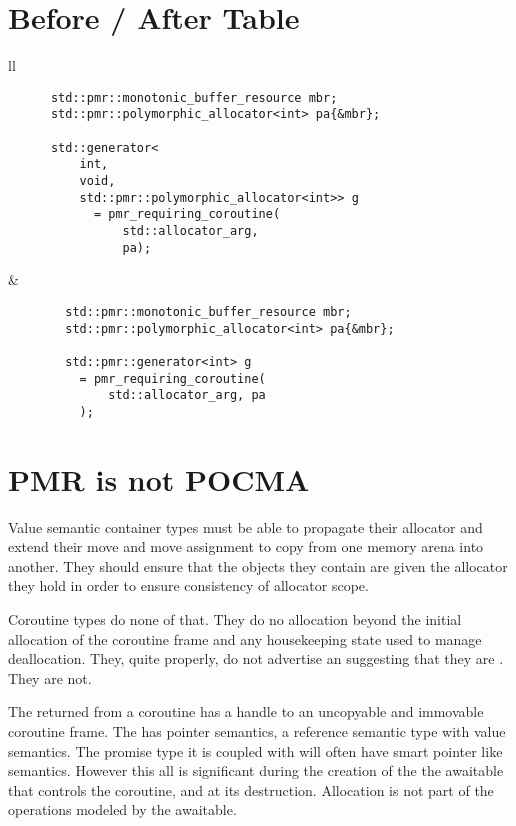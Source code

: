 \documentclass[a4paper,10pt,oneside,openany,final,article]{memoir}
\begin{document}
\chapter{Before / After Table}
\begin{tabular}{ ll }
  \begin{minipage}[t]{0.45\columnwidth}
    \begin{verbatim}
      std::pmr::monotonic_buffer_resource mbr;
      std::pmr::polymorphic_allocator<int> pa{&mbr};

      std::generator<
          int,
          void,
          std::pmr::polymorphic_allocator<int>> g
            = pmr_requiring_coroutine(
                std::allocator_arg,
                pa);
    \end{verbatim}
  \end{minipage}
  &
    \begin{minipage}[t]{0.45\columnwidth}
      \begin{verbatim}
        std::pmr::monotonic_buffer_resource mbr;
        std::pmr::polymorphic_allocator<int> pa{&mbr};

        std::pmr::generator<int> g
          = pmr_requiring_coroutine(
              std::allocator_arg, pa
          );
      \end{verbatim}
    \end{minipage}
\end{tabular}

\chapter{PMR is not POCMA}
Value semantic container types must be able to propagate their allocator and extend their move and move assignment to copy from one memory arena into another. They should ensure that the objects they contain are given the allocator they hold in order to ensure consistency of allocator scope.

Coroutine types do none of that. They do no allocation beyond the initial allocation of the coroutine frame and any housekeeping state used to manage deallocation. They, quite properly, do not advertise an  suggesting that they are . They are not.

The  returned from a coroutine has a handle to an uncopyable and immovable coroutine frame. The  has pointer semantics, a reference semantic type with value semantics. The promise type it is coupled with will often have smart pointer like semantics. However this all is significant during the creation of the the awaitable that controls the coroutine, and at its destruction. Allocation is not part of the operations modeled by the awaitable.
\end{document}
